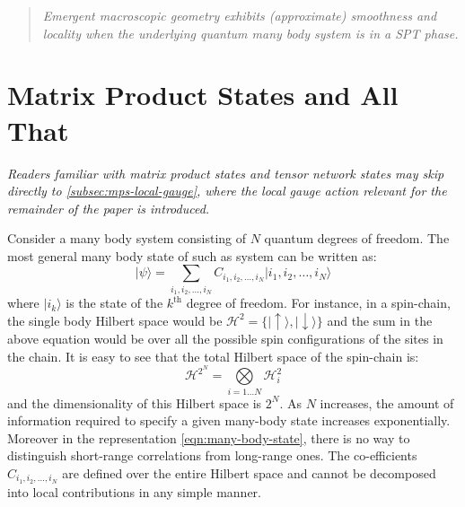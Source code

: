\documentclass[preprint]{SciPost}
\newcommand{\mc}[1]{\mathcal{#1}}
\newcommand{\ket}[1]{\vert #1 \rangle}
\theoremstyle{plain} %
\begin{document}
\noindent\begin{minipage}{\linewidth}
	\centering
	\begin{quote}
		\emph{Emergent macroscopic geometry exhibits (approximate) smoothness and locality when the underlying quantum many body system is in a SPT phase.}
	\end{quote}
\end{minipage}

\section{Matrix Product States and All That}\label{sec:mps-all}

\emph{Readers familiar with matrix product states and tensor network states may skip directly to \autoref{subsec:mps-local-gauge}, where the local gauge action relevant for the remainder of the paper is introduced.}

Consider a many body system consisting of $ N $ quantum degrees of freedom. The most general many body state of such as system can be written as:
\begin{equation}\label{eqn:many-body-state}
	\ket{\psi} = \sum_{i_1, i_2, \ldots, i_N} C_{i_1, i_2, \ldots, i_N} \ket{i_1, i_2, \ldots, i_N}
\end{equation}
where $ \ket{i_k} $ is the state of the $ k^\text{th} $ degree of freedom. For instance, in a spin-chain, the single body Hilbert space would be $ \mc{H}^2 = \{ \ket{\uparrow}, \ket{\downarrow} \} $ and the sum in the above equation would be over all the possible spin configurations of the sites in the chain. It is easy to see that the total Hilbert space of the spin-chain is:
\begin{equation}\label{eqn:n-body-hilbert-space}
	\mc{H}^{2^N} = \underset{i = 1 \ldots N}{\bigotimes} \mc{H}^2_i
\end{equation}
and the dimensionality of this Hilbert space is $ 2^N $. As $ N $ increases, the amount of information required to specify a given many-body state increases exponentially. Moreover in the representation \eqref{eqn:many-body-state}, there is no way to distinguish short-range correlations from long-range ones. The co-efficients $  C_{i_1, i_2, \ldots, i_N} $ are defined over the entire Hilbert space and cannot be decomposed into local contributions in any simple manner.
\end{document}
